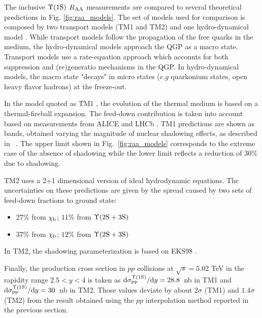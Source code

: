 The inclusive $\mbox{$\Upsilon$(1S)}$ $\mbox{$R_{\rm{AA}}$}$ measurements are compared to several theoretical predictions in Fig. \ref{fig:raa_models}.
The set of models used for comparison is composed by two transport models (TM1 and TM2)\cite{Du:2017qkv,Zhou:2014hwa} and one hydro-dynamical model \cite{Krouppa:2017jlg}.
While transport models follow the propagation of the free quarks in the medium, the hydro-dynamical models approach the QGP as a macro state.
Transport models use a rate-equation approach which accounts for both suppression and (re)generatio mechanisms in the QGP.
In hydro-dynamical models, the macro state "decays" in micro states ($e.g$ quarkonium states, open heavy flavor hadrons) at the freeze-out.

In the model quoted as TM1 \cite{Du:2017qkv}, the evolution of the thermal medium is based on a thermal-fireball expansion.
The feed-down contribution is taken into account based on measurements from ALICE and LHCb \cite{Abelev:2014qha,Aaij:2014caa,Aaij:2014hla}.
TM1 predictions are shown as bands, obtained varying the magnitude of nuclear shadowing effects, as described in ~\cite{Tuchin:2010pv}. 
The upper limit shown in Fig.~\ref{fig:raa_models} corresponds to the extreme case of the absence of shadowing while the lower limit reflects a reduction of $30\%$ due to shadowing.

TM2 \cite{Zhou:2014hwa} uses a 2+1 dimensional version of ideal hydrodynamic equations.
The uncertainties on these predictions are given by the spread caused by two sets of feed-down fractions to \upsis ground state:
\begin{itemize}
\item $27\%$ from $\chi_{\rm b}$; $11\%$ from $\Upsilon({\rm 2S}+{\rm 3S})$
\item $37\%$ from $\chi_{\rm b}$; $12\%$ from $\Upsilon({\rm 2S}+{\rm 3S})$
\end{itemize}
In TM2, the shadowing parameterization is based on EKS98 \cite{Eskola:1998df}.

Finally, the \upsis production cross section in $pp$ collisions at $\sqrt{s}=5.02$ \rm{TeV} in the rapidity range $2.5 < y < 4$ is taken as $\text{d}\sigma^{\rm\Upsilon({\rm 1S})}_{\rm pp}/\text{d}y=28.8$~nb in TM1 and $\text{d}\sigma^{\rm\Upsilon({\rm 1S})}_{\rm pp}/\text{d}y=30$~nb in TM2.
Those values deviate by about $2 \sigma$ (TM1) and $1.4 \sigma$ (TM2) from the result obtained using the $pp$ interpolation method reported in the previous section.

